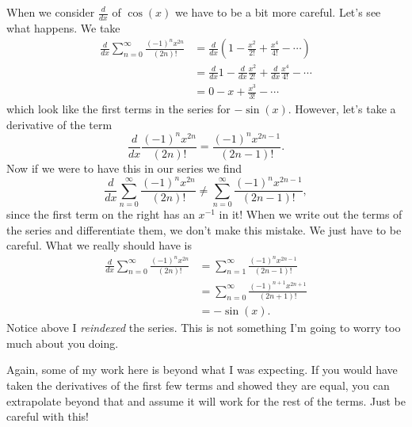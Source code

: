 \documentclass[12pt]{article} %
\begin{document}
\begin{solution}
\begin{enumerate}[(a)]
		When we consider $\frac{d}{dx}$ of $\cos(x)$ we have to be a bit more careful.  Let's see what happens.  We take
		\begin{align*}
			\frac{d}{dx} \sum_{n=0}^\infty \frac{(-1)^n x^{2n}}{(2n)!} &= \frac{d}{dx} \left(1-\frac{x^2}{2!}+\frac{x^4}{4!} - \cdots \right)\\
			&= \frac{d}{dx} 1 -\frac{d}{dx} \frac{x^2}{2!} +\frac{d}{dx} \frac{x^4}{4!} - \cdots\\
			&= 0 - x +\frac{x^3}{3!} - \cdots
		\end{align*}
		which look like the first terms in the series for $-\sin(x)$. However, let's take a derivative of the term
		\[
		\frac{d}{dx} \frac{(-1)^n x^{2n}}{(2n)!} = \frac{(-1)^n x^{2n-1}}{(2n-1)!}.
		\]
		Now if we were to have this in our series we find
		\[
		\frac{d}{dx} \sum_{n=0}^\infty \frac{(-1)^n x^{2n}}{(2n)!} \not=  \sum_{n=0}^\infty \frac{(-1)^n x^{2n-1}}{(2n-1)!},
		\]
		since the first term on the right has an $x^{-1}$ in it! When we write out the terms of the series and differentiate them, we don't make this mistake.  We just have to be careful.  What we really should have is
		\begin{align*}
			\frac{d}{dx} \sum_{n=0}^\infty \frac{(-1)^n x^{2n}}{(2n)!} &=  \sum_{n=1}^\infty \frac{(-1)^n x^{2n-1}}{(2n-1)!}\\
			&=\sum_{n=0}^\infty \frac{(-1)^{n+1} x^{2n+1}}{(2n+1)!}\\
			&= -\sin(x).
		\end{align*}
		Notice above I \emph{reindexed} the series.  This is not something I'm going to worry too much about you doing.
	\end{enumerate}
\end{solution}
\begin{remark}
	Again, some of my work here is beyond what I was expecting. If you would have taken the derivatives of the first few terms and showed they are equal, you can extrapolate beyond that and assume it will work for the rest of the terms.  Just be careful with this!
\end{remark}
\end{document}
